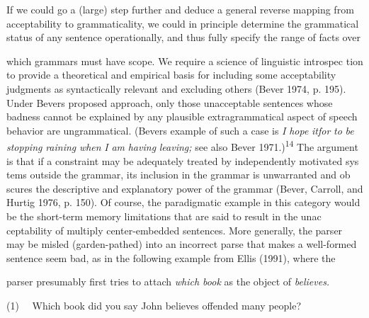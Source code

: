 \begin{styleTextbody}
If we could go a (large) step further and deduce a general reverse mapping from acceptability to grammaticality, we could in principle determine the grammatical status of any sentence operationally, and thus fully specify the range of facts over
\end{styleTextbody}


\clearpage\setcounter{page}{1}\begin{styleTextbody}
which grammars must have scope. {\textquotedbl}We require a science of linguistic introspec\- tion to provide a theoretical and empirical basis for including some acceptability judgments as syntactically relevant and excluding others{\textquotedbl} (Bever 1974, p. 195). Under Bever{\textquotesingle}s proposed approach, only those unacceptable sentences whose badness cannot be explained by any plausible extragrammatical aspect of speech behavior are ungrammatical. (Bever{\textquotesingle}s example of such a case is \textit{I}\textit{ }\textit{hope}\textit{ }\textit{itfor}\textit{ }\textit{to}\textit{ }\textit{be}\textit{ }\textit{stopping}\textit{ }\textit{raining}\textit{ }\textit{when}\textit{ }\textit{I}\textit{ }\textit{am}\textit{ }\textit{having}\textit{ }\textit{leaving;}\textit{ }see also Bever 1971.)\textsuperscript{14}\textsuperscript{ }The argument is that {\textquotedbl}if a constraint may be adequately treated by independently motivated sys\- tems outside the grammar, its inclusion in the grammar is unwarranted and ob\- scures the descriptive and explanatory power of the grammar{\textquotedbl} (Bever, Carroll, and Hurtig 1976, p. 150). Of course, the paradigmatic example in this category would be the short-term memory limitations that are said to result in the unac\- ceptability of multiply center-embedded sentences. More generally, the parser may be misled (garden-pathed) into an incorrect parse that makes a well-formed sentence seem bad, as in the following example from Ellis (1991), where the
\end{styleTextbody}


\begin{styleStandard}
parser presumably first tries to attach \textit{which book}\textit{ }as the object of \textit{believes.}
\end{styleStandard}


\begin{styleTextbody}
(1) \ \ Which book did you say John believes offended many people?
\end{styleTextbody}



